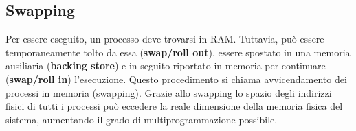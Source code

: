 \documentclass{article}
\begin{document}
		\subsection{Swapping}
			Per essere eseguito, un processo deve trovarsi in RAM. Tuttavia, può essere temporaneamente tolto da essa (\textbf{swap/roll out}), essere spostato in una memoria ausiliaria (\textbf{backing store}) e in seguito riportato in memoria per continuare (\textbf{swap/roll in}) l’esecuzione. Questo procedimento si chiama avvicendamento dei processi in memoria (swapping). Grazie allo swapping lo spazio degli indirizzi fisici di tutti i processi può eccedere la reale dimensione della memoria fisica del sistema, aumentando il grado di multiprogrammazione possibile.
			\begin{figure}[ht!]
			\end{figure}
\end{document}
